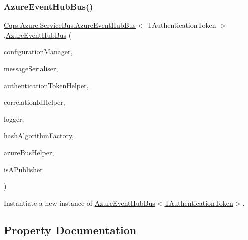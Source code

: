 \subsubsection{\texorpdfstring{Azure\+Event\+Hub\+Bus()}{AzureEventHubBus()}}
{\footnotesize\ttfamily \hyperlink{classCqrs_1_1Azure_1_1ServiceBus_1_1AzureEventHubBus}{Cqrs.\+Azure.\+Service\+Bus.\+Azure\+Event\+Hub\+Bus}$<$ T\+Authentication\+Token $>$.\hyperlink{classCqrs_1_1Azure_1_1ServiceBus_1_1AzureEventHubBus}{Azure\+Event\+Hub\+Bus} (\begin{DoxyParamCaption}\item[{\hyperlink{interfaceCqrs_1_1Configuration_1_1IConfigurationManager}{I\+Configuration\+Manager}}]{configuration\+Manager,  }\item[{\hyperlink{interfaceCqrs_1_1Azure_1_1ServiceBus_1_1IMessageSerialiser}{I\+Message\+Serialiser}$<$ T\+Authentication\+Token $>$}]{message\+Serialiser,  }\item[{\hyperlink{interfaceCqrs_1_1Authentication_1_1IAuthenticationTokenHelper}{I\+Authentication\+Token\+Helper}$<$ T\+Authentication\+Token $>$}]{authentication\+Token\+Helper,  }\item[{I\+Correlation\+Id\+Helper}]{correlation\+Id\+Helper,  }\item[{I\+Logger}]{logger,  }\item[{\hyperlink{interfaceCqrs_1_1Bus_1_1IHashAlgorithmFactory}{I\+Hash\+Algorithm\+Factory}}]{hash\+Algorithm\+Factory,  }\item[{\hyperlink{interfaceCqrs_1_1Azure_1_1ServiceBus_1_1IAzureBusHelper}{I\+Azure\+Bus\+Helper}$<$ T\+Authentication\+Token $>$}]{azure\+Bus\+Helper,  }\item[{bool}]{is\+A\+Publisher }\end{DoxyParamCaption})\hspace{0.3cm}{\ttfamily [protected]}}



Instantiate a new instance of \hyperlink{classCqrs_1_1Azure_1_1ServiceBus_1_1AzureEventHubBus_a1012686c6448f1cee1d06aca0a605df4_a1012686c6448f1cee1d06aca0a605df4}{Azure\+Event\+Hub\+Bus$<$\+T\+Authentication\+Token$>$}. 



\subsection{Property Documentation}
\mbox{\label{classCqrs_1_1Azure_1_1ServiceBus_1_1AzureEventHubBus_ac70c513a41f42208cc3332d4ed855af8_ac70c513a41f42208cc3332d4ed855af8}} 
